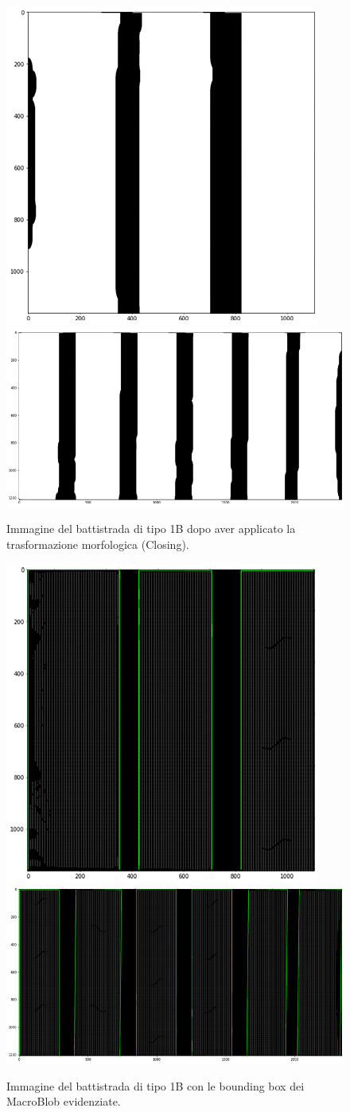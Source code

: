 \begin{figure}[H]
	\centering
	\includegraphics[height=0.32\columnwidth]{./pictures/batt_1b_analisi_1_7.png}
	\includegraphics[height=0.32\columnwidth]{./pictures/batt_1b_analisi_2_7.png}
	\caption{Immagine del battistrada di tipo 1B dopo aver applicato la trasformazione morfologica (Closing).}\label{fig:batt_1b_analisi_7}
\end{figure}

\begin{figure}[H]
	\centering
	\includegraphics[height=0.32\columnwidth]{./pictures/batt_1b_analisi_1_8.png}
	\includegraphics[height=0.32\columnwidth]{./pictures/batt_1b_analisi_2_8.png}
	\caption{Immagine del battistrada di tipo 1B con le bounding box dei MacroBlob evidenziate.}\label{fig:batt_1b_analisi_8}
\end{figure}


